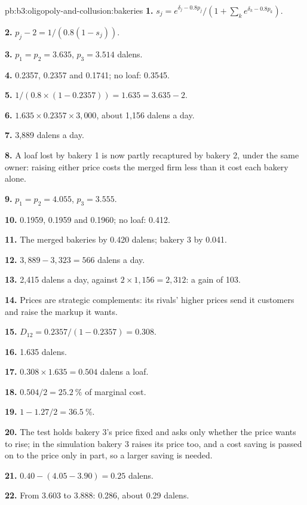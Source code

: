\begin{solution}{pb:b3:oligopoly-and-collusion:bakeries}
\textbf{1.} $s_j = e^{\delta_j - 0.8p_j}/(1 + \sum_k e^{\delta_k - 0.8p_k})$.

\textbf{2.} $p_j - 2 = 1/(0.8(1 - s_j))$.

\textbf{3.} $p_1 = p_2 = 3.635$, $p_3 = 3.514$ dalens.

\textbf{4.} 0.2357, 0.2357 and 0.1741; no loaf: 0.3545.

\textbf{5.} $1/(0.8 \times (1 - 0.2357)) = 1.635 = 3.635 - 2$.

\textbf{6.} $1.635 \times 0.2357 \times 3{,}000$, about 1{,}156 dalens a day.

\textbf{7.} 3{,}889 dalens a day.

\textbf{8.} A loaf lost by bakery 1 is now partly recaptured by bakery 2, under the same
owner: raising either price costs the merged firm less than it cost each bakery alone.

\textbf{9.} $p_1 = p_2 = 4.055$, $p_3 = 3.555$.

\textbf{10.} 0.1959, 0.1959 and 0.1960; no loaf: 0.412.

\textbf{11.} The merged bakeries by 0.420 dalens; bakery 3 by 0.041.

\textbf{12.} $3{,}889 - 3{,}323 = 566$ dalens a day.

\textbf{13.} 2{,}415 dalens a day, against $2 \times 1{,}156 = 2{,}312$: a gain of 103.

\textbf{14.} Prices are strategic complements: its rivals' higher prices send it
customers and raise the markup it wants.

\textbf{15.} $D_{12} = 0.2357/(1 - 0.2357) = 0.308$.

\textbf{16.} 1.635 dalens.

\textbf{17.} $0.308 \times 1.635 = 0.504$ dalens a loaf.

\textbf{18.} $0.504/2 = 25.2~\%$ of marginal cost.

\textbf{19.} $1 - 1.27/2 = 36.5~\%$.

\textbf{20.} The test holds bakery 3's price fixed and asks only whether the price
wants to rise; in the simulation bakery 3 raises its price too, and a cost saving is
passed on to the price only in part, so a larger saving is needed.

\textbf{21.} $0.40 - (4.05 - 3.90) = 0.25$ dalens.

\textbf{22.} From 3.603 to 3.888: 0.286, about 0.29 dalens.


\end{solution}
